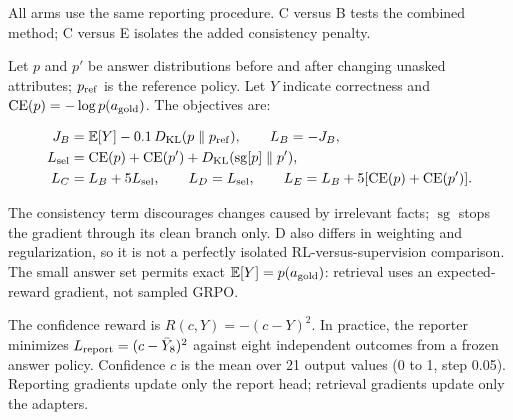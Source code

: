 \documentclass[10pt,a4paper]{article}
\begin{document}
All arms use the same reporting procedure. C versus B tests the combined method; C versus E isolates the added consistency penalty.
\par

\par{}\par\smallskip

Let $p$ and $p'$ be answer distributions before and after changing unasked attributes; $p_{\rm ref}$ is the reference policy. Let $Y$ indicate correctness and $\mathrm{CE}(p)=-\log p(a_{\rm gold})$. The objectives are:
\par

\[
\begin{aligned} J_B &= \mathbb{E}[Y]-0.1\,D_{\rm KL}(p\parallel p_{\rm ref}),\qquad L_B=-J_B,\\ L_{\rm sel} &= \mathrm{CE}(p)+\mathrm{CE}(p')+D_{\rm KL}(\operatorname{sg}[p]\parallel p'),\\ L_C &= L_B+5L_{\rm sel},\qquad L_D=L_{\rm sel},\qquad L_E=L_B+5[\mathrm{CE}(p)+\mathrm{CE}(p')]. \end{aligned}
\]

The consistency term discourages changes caused by irrelevant facts; $\operatorname{sg}$ stops the gradient through its clean branch only. D also differs in weighting and regularization, so it is not a perfectly isolated RL-versus-supervision comparison. The small answer set permits exact $\mathbb{E}[Y]=p(a_{\rm gold})$: retrieval uses an expected-reward gradient, not sampled GRPO.
\par

The confidence reward is $R(c,Y)=-(c-Y)^2$. In practice, the reporter minimizes $L_{\rm report}=(c-\bar Y_8)^2$ against eight independent outcomes from a frozen answer policy. Confidence $c$ is the mean over 21 output values (0 to 1, step 0.05). Reporting gradients update only the report head; retrieval gradients update only the adapters.
\par
\end{document}

